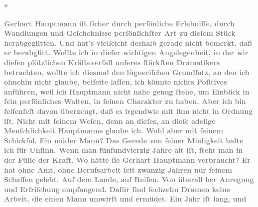 \pstart
           \centering{}\textcolor{gray}{\textbf{*}}\pend
           
\pstart
           \textcolor{gray}{\textbf{Gerhart Hauptmann iſt{ }ſicher durch
                  perſönliche Erlebniſſe, durch Wandlungen und Geſchehnisse perſönlichſter Art zu
                  dieſem Stück
                  herabgeglitten. Und hat’s vielleicht deshalb gerade nicht bemerkt, daß er
                  herabglitt. Wollte ich in dieſer wichtigen Angelegenheit, in der wir dieſen
                  plötzlichen Kräfteverfall unſeres{ }ſtärkſten Dramatikers betrachten, wollte ich
                  diesmal den lügneriſchen Grundſatz, an den ich ohnehin nicht glaube, beiſeite
                  laſſen, ich könnte nichts Poſitives anführen, weil ich Hauptmann nicht nahe genug{ }ſtehe, um Einblick in{ }ſein
                  perſönliches Walten, in{ }ſeinen Charakter zu haben. Aber ich bin felſenfeſt davon
                  überzeugt, daß es irgendwie mit ihm nicht in Ordnung iſt. Nicht mit{ }ſeinem Weſen,
                  denn an dieſes, an dieſe adelige Menſchlichkeit Hauptmanns glaube ich. Wohl aber mit{ }ſeinem Schickſal. Ein müder Mann?
                  Das Gerede von{ }ſeiner Müdigkeit halte ich für Unſinn. Wenn man fünfundvierzig
                  Jahre alt iſt,{ }ſteht man in der Fülle der Kraft. Wo hätte{ }ſie Gerhart Hauptmann verbraucht? Er hat ohne Amt, ohne
                  Berufsarbeit{ }ſeit zwanzig Jahren nur{ }ſeinem Schaffen gelebt. Auf dem Lande, auf
                  Reiſen. Von überall her Anregung und Erfriſchung empfangend. Dafür{ }ſind{ }ſechzehn
                  Dramen keine Arbeit, die einen Mann umwirft und ermüdet. Ein Jahr iſt lang, und
}}
